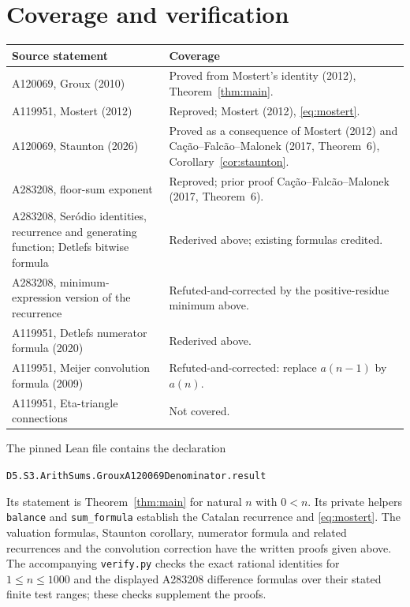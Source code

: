 \documentclass[11pt]{article}
\begin{document}
\section{Coverage and verification}
\begin{center}\small
\begin{tabular}{@{}p{.46\linewidth}p{.46\linewidth}@{}}
\toprule Source statement & Coverage \\ \midrule
A120069, Groux (2010) & Proved from Mostert's identity (2012), Theorem~\ref{thm:main}. \\
A119951, Mostert (2012) & Reproved; Mostert (2012), \eqref{eq:mostert}. \\
A120069, Staunton (2026) & Proved as a consequence of Mostert (2012) and Ca\c{c}\~ao--Falc\~ao--Malonek (2017, Theorem~6), Corollary~\ref{cor:staunton}. \\
A283208, floor-sum exponent & Reproved; prior proof Ca\c{c}\~ao--Falc\~ao--Malonek (2017, Theorem~6). \\
A283208, Ser\'odio identities, recurrence and generating function; Detlefs bitwise formula & Rederived above; existing formulas credited. \\
A283208, minimum-expression version of the recurrence & Refuted-and-corrected by the positive-residue minimum above. \\
A119951, Detlefs numerator formula (2020) & Rederived above. \\
A119951, Meijer convolution formula (2009) & Refuted-and-corrected: replace $a(n-1)$ by $a(n)$. \\
A119951, Eta-triangle connections & Not covered. \\
\bottomrule
\end{tabular}
\end{center}
The pinned Lean file \cite{lean} contains the declaration
\begin{center}\small
\texttt{D5.S3.ArithSums.GrouxA120069Denominator.result}
\end{center}
Its statement is Theorem~\ref{thm:main} for natural $n$ with $0<n$.
Its private helpers \texttt{balance} and \texttt{sum\_formula}
establish the Catalan recurrence and \eqref{eq:mostert}.
The valuation formulas, Staunton corollary, numerator formula and
related recurrences and the convolution correction have the written proofs given above.
The accompanying \texttt{verify.py} checks the exact rational identities
for $1\leq n\leq1000$ and the displayed A283208 difference formulas
over their stated finite test ranges; these checks supplement the proofs.
\end{document}
